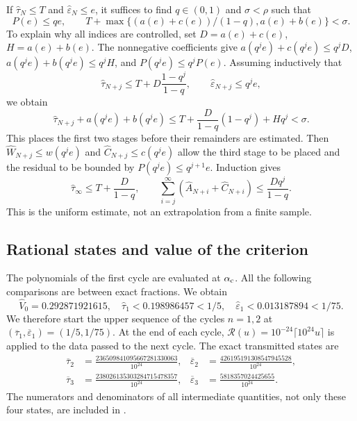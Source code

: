 \documentclass[11pt,a4paper]{article}
\numberwithin{equation}{section}
\numberwithin{table}{section}
\theoremstyle{plain}
\theoremstyle{definition}\newtheorem{definition}[theorem]{Definition}
\theoremstyle{remark}\newtheorem{remark}[theorem]{Remark}
\begin{document}
If $\widehat\tau_N\leq T$ and $\widehat\varepsilon_N\leq e$, it
suffices to find $q\in(0,1)$ and $\sigma<\rho$ such that
\begin{equation}
 P(e)\leq qe,\qquad
 T+\max\{(a(e)+c(e))/(1-q),a(e)+b(e)\}<\sigma.
 \label{supp:eq:tail-test}
\end{equation}
To explain why all indices are controlled, set $D=a(e)+c(e)$,
$H=a(e)+b(e)$. The nonnegative coefficients give
$a(q^je)+c(q^je)\leq q^jD$, $a(q^je)+b(q^je)\leq q^jH$, and
$P(q^je)\leq q^jP(e)$. Assuming inductively that
\[
 \widehat\tau_{N+j}\leq T+D\frac{1-q^j}{1-q},\qquad
 \widehat\varepsilon_{N+j}\leq q^je,
\]
we obtain
\[
 \widehat\tau_{N+j}+a(q^je)+b(q^je)
 \leq T+\frac D{1-q}(1-q^j)+Hq^j<\sigma.
\]
This places the first two stages before their remainders are estimated.
Then $\widehat W_{N+j}\leq w(q^je)$ and
$\widehat C_{N+j}\leq c(q^je)$ allow the third stage to be placed and
the residual to be bounded by $P(q^je)\leq q^{j+1}e$. Induction gives
\begin{equation}
 \widehat\tau_\infty\leq T+\frac D{1-q},\qquad
 \sum_{i=j}^{\infty}(\widehat A_{N+i}+\widehat C_{N+i})
 \leq\frac{Dq^j}{1-q}.
 \label{supp:eq:tail-consequence}
\end{equation}
This is the uniform estimate, not an extrapolation from a finite sample.

\subsection{Rational states and value of the criterion}\label{supp:rational-states}
The polynomials of the first cycle are evaluated at $\alpha_{\rm c}$.
All the following comparisons are between exact fractions. We obtain
\[
 \widehat V_0=0.292871921615,\quad
 \widehat\tau_1<0.198986457<1/5,\quad
 \widehat\varepsilon_1<0.013187894<1/75.
\]
We therefore start the upper sequence of the cycles $n=1,2$ at
$(\overline\tau_1,\overline\varepsilon_1)=(1/5,1/75)$.
At the end of each cycle, $\mathcal R(u)=10^{-24}\lceil10^{24}u\rceil$
is applied to the data passed to the next cycle. The exact transmitted
states are
\begin{equation}
 \begin{aligned}
 \overline\tau_2&=\frac{236509841095667281330063}{10^{24}},&
 \overline\varepsilon_2&=\frac{426195191308547945528}{10^{24}},\\
 \overline\tau_3&=\frac{238026135303284715478357}{10^{24}},&
 \overline\varepsilon_3&=\frac{5818357024425655}{10^{24}}.
 \end{aligned}\label{supp:eq:exact-states}
\end{equation}
The numerators and denominators of all intermediate quantities, not
only these four states, are included in
.
\end{document}
